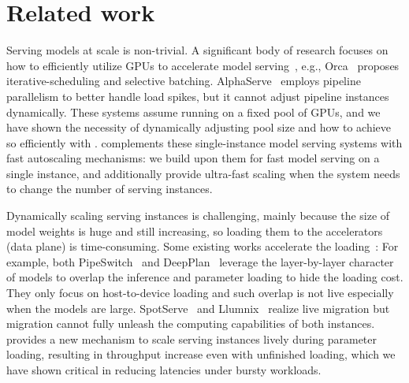 \section{Related work}
\label{sec:related}

Serving models at scale is non-trivial.
A significant body of research focuses on how to efficiently utilize GPUs to accelerate model serving~\cite{DBLP:conf/osdi/ZhongLCHZL0024,DBLP:journals/corr/abs-2404-09526,vllm,alpaserve,DBLP:conf/osdi/YuJKKC22,DBLP:conf/isca/PatelCZSGMB24,298501,kvcache},
e.g., 
Orca~\cite{DBLP:conf/osdi/YuJKKC22} proposes iterative-scheduling and selective batching. 
AlphaServe~\cite{alpaserve} employs pipeline parallelism to better handle load spikes,
but it cannot adjust pipeline instances dynamically.
These systems assume running on a fixed pool of GPUs,
and we have shown the
necessity of dynamically adjusting pool size and how to achieve so efficiently with {\sys}.
{\sys} complements these single-instance model serving systems with fast autoscaling mechanisms:
we build upon them for fast model serving on a single instance,
and additionally provide ultra-fast scaling when the system needs to change
the number of serving instances.

Dynamically scaling serving instances is challenging, mainly because the size of model weights is huge
and still increasing,
so loading them to the accelerators (data plane) is time-consuming.
Some existing works accelerate the loading~\cite{pipeswitch, DBLP:conf/eurosys/JeongBA23, DBLP:conf/asplos/MiaoSDXL0J24, DBLP:conf/osdi/SunHZXZL024}:
For example, both PipeSwitch~\cite{pipeswitch} and DeepPlan~\cite{DBLP:conf/eurosys/JeongBA23} leverage the layer-by-layer character of models
to overlap the inference and parameter loading to hide the loading cost. 
They only focus on host-to-device loading and such overlap is not live especially when the models are large.
SpotServe~\cite{DBLP:conf/asplos/MiaoSDXL0J24} and Llumnix~\cite{DBLP:conf/osdi/SunHZXZL024}
realize live migration but migration cannot fully unleash the computing
capabilities of both instances.
{\sys} provides a new mechanism to scale serving instances lively during parameter loading,
resulting in throughput increase even with unfinished loading,
which we have shown critical in reducing latencies under bursty workloads.


